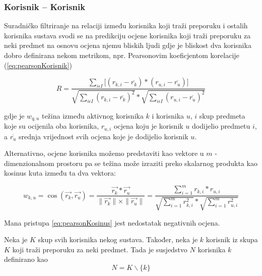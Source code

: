 \documentclass[times, utf8, diplomski, numeric]{fer}
\begin{document}
\subsubsection{Korisnik -- Korisnik}
Suradničko filtriranje na relaciji između korisnika koji traži preporuku i
ostalih korisnika sustava svodi se na predikciju ocjene korisnika koji traži
preporuku za neki predmet na osnovu ocjena njemu bliskih ljudi gdje je bliskost
dva korisnika dobro definirana nekom metrikom, npr. Pearsonovim koeficjentom
korelacije (\ref{eq:pearsonKorisnik})

\begin{equation}
\label{eq:pearsonKorisnik}
	R = \frac
			{\sum_{i \epsilon I} 
				\big[
					(r_{k,i} - \overline{r_k}) \ast
					(r_{u,i} - \overline{r_u})
				\big]
			}
			{
				\sqrt{{\sum_{i \epsilon I} (r_{k,i} - \overline{r_k})^2}} \ast 
				\sqrt{{\sum_{i \epsilon I} (r_{u,i} - \overline{r_u})^2}}
			}
\end{equation}

gdje je $w_{q,u}$ težina između aktivnog korisnika $k$ i korisnika $u$, $i$ skup
predmeta koje su ocijenila oba korisnika, $r_{u,i}$ ocjena koju je korisnik $u$
dodijelio predmetu $i$, a $\overline{r_u}$ srednja vrijednost svih ocjena koje
je dodijelio korisnik $u$.

Alternativno, ocjene korisnika možemo predstaviti kao vektore u
$m$ - dimenzionalnom prostoru pa se težina može izraziti preko skalarnog
produkta kao kosinus kuta između ta dva vektora:

\begin{equation}
\label{eq:pearsonKosinus}
	w_{k,u} = 
		\cos{(\vec{r_k}, \vec{r_u})} = 
		\frac
			{\vec{r_k} \ast \vec{r_u}}
			{\|\vec{r_k}\| \times \|\vec{r_u}\|} = 
		\frac
			{\sum_{i=1}^m r_{k,i} \ast r_{u,i}}
			{\sqrt{\sum_{i=1}^m r_{k,i}^2} \ast \sqrt{\sum_{i=1}^m r_{u,i}^2}}
\end{equation}

Mana pristupa \ref{eq:pearsonKosinus} jest nedostatak negativnih ocjena.

Neka je $K$ skup svih korisnika nekog sustava. Također, neka je $k$ korisnik iz
skupa $K$ koji traži preporuku za neki predmet. Tada je susjedstvo $N$
korisnika $k$ definirano kao
\begin{equation}
\label{eq:susjedstvo}
	N = K \backslash \{k\}
\end{equation}
\end{document}
